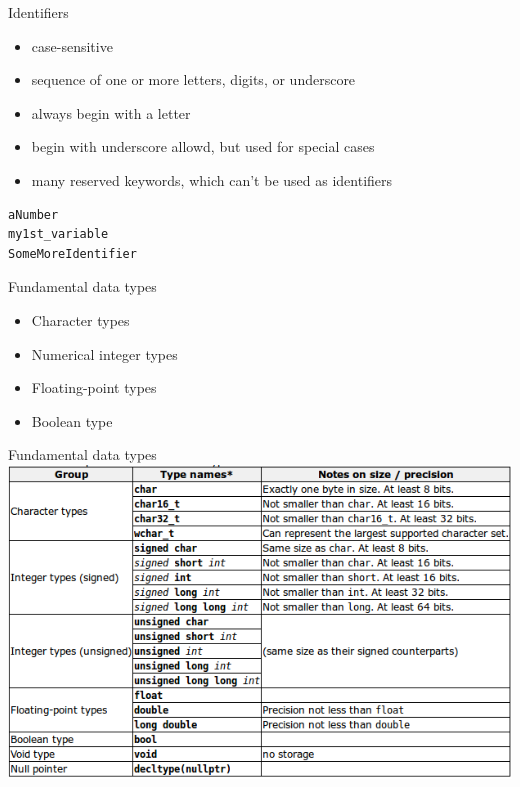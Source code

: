\documentclass{beamer}
\begin{document}
\begin{frame}[fragile]{Identifiers}
\begin{itemize}
  \item case-sensitive
  \item sequence of one or more letters, digits, or underscore
  \item always begin with a letter
  \item begin with underscore allowd, but used for special cases
  \item many reserved keywords, which can't be used as identifiers 
\end{itemize}
\begin{lstlisting}[caption=Identifiers Examples]
aNumber
my1st_variable
SomeMoreIdentifier
\end{lstlisting}
\end{frame}

\begin{frame}{Fundamental data types}
\begin{itemize}
  \item Character types
  \item Numerical integer types
  \item Floating-point types
  \item Boolean type
\end{itemize}
\end{frame}

\begin{frame}{Fundamental data types}
\includegraphics[scale=0.48]{img/FundamentalTypes.png}
\end{frame}
\end{document}
